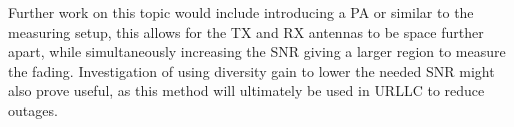 Further work on this topic would include introducing a \gls{PA} or similar to the measuring setup, this allows for the TX and RX antennas to be space further apart, while simultaneously increasing the SNR giving a larger region to measure the fading. Investigation of using diversity gain to lower the needed SNR might also prove useful, as this method will ultimately be used in \gls{URLLC} to reduce outages.




